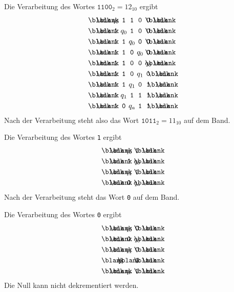 \begin{loesung}
\begin{center}
\begin{tikzpicture}[>=latex,thick]
\end{tikzpicture}
\end{center}
\def\z#1{\hbox to0.4cm{\hfill\clap{$#1$}\hfill}}
\def\zb{\hbox to0.4cm{\hfill\clap{\blank}\hfill}}
\def\zt#1{\hbox to0.4cm{\hfill\clap{\texttt{#1}}\hfill}}
\begin{teilaufgaben}
\item
Die Verarbeitung des Wortes $\texttt{1100}_2=12_{10}$ ergibt
\begin{align*}
&\zb \zb \z{q_0} \zt{1}  \zt{1}  \zt{0}  \zt{0}  \zb \zb \\
&\zb \zb \zt{1}  \z{q_0} \zt{1}  \zt{0}  \zt{0}  \zb \zb \\
&\zb \zb \zt{1}  \zt{1}  \z{q_0} \zt{0}  \zt{0}  \zb \zb \\
&\zb \zb \zt{1}  \zt{1}  \zt{0}  \z{q_0} \zt{0}  \zb \zb \\
&\zb \zb \zt{1}  \zt{1}  \zt{0}  \zt{0}  \z{q_0} \zb \zb \\
&\zb \zb \zt{1}  \zt{1}  \zt{0}  \z{q_1} \zt{0}  \zb \zb \\
&\zb \zb \zt{1}  \zt{1}  \z{q_1} \zt{0}  \zt{1}  \zb \zb \\
&\zb \zb \zt{1}  \z{q_1} \zt{1}  \zt{1}  \zt{1}  \zb \zb \\
&\zb \zb \zt{1}  \zt{0}  \z{q_a} \zt{1}  \zt{1}  \zb \zb \\
\end{align*}
Nach der Verarbeitung steht also das Wort $\texttt{1011}_2=11_{10}$
auf dem Band.
\item
Die Verarbeitung des Wortes \texttt{1} ergibt
\begin{align*}
&\zb \zb \z{q_0} \zt{1}  \zb \zb \\
&\zb \zb \zt{1}  \z{q_0} \zb \zb \\
&\zb \zb \z{q_1} \zt{1}  \zb \zb \\
&\zb \zb \zt{0}  \z{q_a} \zb \zb \\
\end{align*}
Nach der Verarbeitung steht das Wort \texttt{0} auf dem Band.
\item
Die Verarbeitung des Wortes \texttt{0} ergibt
\begin{align*}
&\zb \zb     \z{q_0} \zt{0}  \zb \zb \\
&\zb \zb     \zt{0}  \z{q_0} \zb \zb \\
&\zb \zb     \z{q_1} \zt{0}  \zb \zb \\
&\zb \z{q_1} \zb     \zt{1}  \zb \zb \\
&\zb \zb     \z{q_r} \zt{1}  \zb \zb \\
\end{align*}
Die Null kann nicht dekrementiert werden.
\qedhere
\end{teilaufgaben}
\end{loesung}

